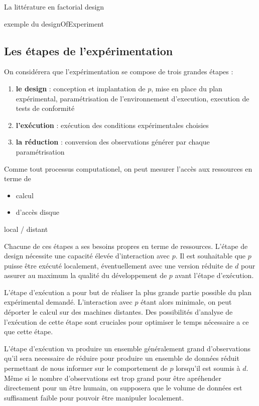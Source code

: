 La littérature en factorial design

exemple du designOfExperiment 

\subsection{Les étapes de l'expérimentation}

On considérera que l'expérimentation se compose de trois grandes étapes :
\begin{enumerate}
  \item \textbf{le design} : conception et implantation de $p$, mise en place du plan expérimental, paramétrisation de l'environnement d'execution, execution de tests de conformité
  \item \textbf{l'exécution} : exécution des conditions expérimentales choisies
  \item \textbf{la réduction} : conversion des observations générer par chaque paramétrisation
\end{enumerate}

Comme tout processus computationel, on peut mesurer l'accès aux ressources en terme de
\begin{itemize}
  \item calcul
  \item d'accès disque
\end{itemize}

local / distant

Chacune de ces étapes a ses besoins propres en terme de ressources. L'étape de design nécessite une capacité élevée d'interaction avec $p$. Il est souhaitable que $p$ puisse être exécuté localement, éventuellement avec une version réduite de $d$ pour assurer au maximum la qualité du développement de $p$ avant l'étape d'exécution.

L'étape d'exécution a pour but de réaliser la plus grande partie possible du plan expérimental demandé. L'interaction avec $p$ étant alors minimale, on peut déporter le calcul sur des machines distantes. Des possibilités d'analyse de l'exécution de cette étape sont cruciales pour optimiser le temps nécessaire a ce que cette étape.

L'étape d'exécution va produire un ensemble généralement grand d'observations qu'il sera necessaire de réduire pour produire un ensemble de données réduit permettant de nous informer sur le comportement de $p$ lorsqu'il est soumis à $d$. Même si le nombre d'observations est trop grand pour être apréhender directement pour un être humain, on supposera que le volume de données est suffisament faible pour pouvoir être manipuler localement.

